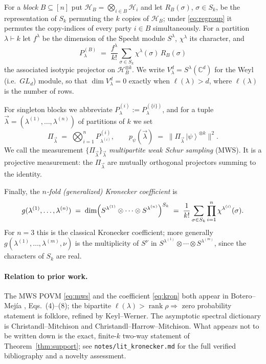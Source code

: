 \documentclass[11pt]{article}
\theoremstyle{definition}
\theoremstyle{remark}
\newcommand{\bmlam}{\vec{\lambda}}
\newcommand{\rank}{\operatorname{rank}}
\newcommand{\Cx}{\mathbb{C}}
\newcommand{\Hil}{\mathcal{H}}
\newcommand{\ket}[1]{\left|#1\right\rangle}
\begin{document}
For a \emph{block} $B \subseteq [n]$ put $\Hil_B = \bigotimes_{i \in B}\Hil_i$ and let
$R_B(\sigma)$, $\sigma \in S_k$, be the representation of $S_k$ permuting the $k$ copies
of $\Hil_B$; under \eqref{eq:regroup} it permutes the copy-indices of every party
$i \in B$ simultaneously. For a partition $\lambda \vdash k$ let $f^\lambda$ be the
dimension of the Specht module $S^\lambda$, $\chi^\lambda$ its character, and
\begin{equation}
  P^{(B)}_\lambda \;=\; \frac{f^\lambda}{k!}\sum_{\sigma \in S_k}
     \chi^\lambda(\sigma)\, R_B(\sigma)
  \label{eq:proj}
\end{equation}
the associated isotypic projector on $\Hil_B^{\otimes k}$. We write
$V^{d}_\lambda = S^\lambda(\Cx^{d})$ for the Weyl (i.e.\ $GL_d$) module, so that
$\dim V^d_\lambda = 0$ exactly when $\ell(\lambda) > d$, where $\ell(\lambda)$ is the
number of rows.

For singleton blocks we abbreviate $P^{(i)}_\lambda := P^{(\{i\})}_\lambda$, and for a
tuple $\bmlam = (\lambda^{(1)},\dots,\lambda^{(n)})$ of partitions of $k$ we set
\begin{equation}
  \Pi_{\bmlam} \;=\; \bigotimes_{i=1}^n P^{(i)}_{\lambda^{(i)}},
  \qquad
  p_\psi(\bmlam) \;=\; \bigl\| \Pi_{\bmlam}\, \ket{\psi}^{\otimes k} \bigr\|^2 .
  \label{eq:mws}
\end{equation}
We call the measurement $\{\Pi_{\bmlam}\}_{\bmlam}$ \emph{multipartite weak Schur
sampling} (MWS). It is a projective measurement: the $\Pi_{\bmlam}$ are mutually
orthogonal projectors summing to the identity.

Finally, the \emph{$n$-fold (generalized) Kronecker coefficient} is
\begin{equation}
  g(\lambda^{(1)},\dots,\lambda^{(n)})
    \;=\; \dim \Bigl( S^{\lambda^{(1)}} \otimes \cdots \otimes S^{\lambda^{(n)}}
          \Bigr)^{S_k}
    \;=\; \frac{1}{k!}\sum_{\sigma \in S_k} \prod_{i=1}^n \chi^{\lambda^{(i)}}(\sigma).
  \label{eq:kron}
\end{equation}
For $n=3$ this is the classical Kronecker coefficient; more generally
$g(\lambda^{(1)},\dots,\lambda^{(m)},\nu)$ is the multiplicity of $S^\nu$ in
$S^{\lambda^{(1)}}\otimes\cdots\otimes S^{\lambda^{(m)}}$, since the characters of
$S_k$ are real.

\paragraph{Relation to prior work.}
The MWS POVM \eqref{eq:mws} and the coefficient \eqref{eq:kron} both appear in
Botero--Mej\'ia \cite{BoteroMejia2018}, Eqs.\ (4)--(8); the bipartite
$\ell(\lambda) > \rank\rho \Rightarrow$ zero probability statement is folklore, refined
by Keyl--Werner. The asymptotic spectral dictionary is Christandl--Mitchison and
Christandl--Harrow--Mitchison. What appears not to be written down is the exact,
finite-$k$ two-way statement of Theorem~\ref{thm:support}; see
\texttt{notes/lit\_kronecker.md} for the full verified bibliography and a novelty
assessment.
\end{document}
